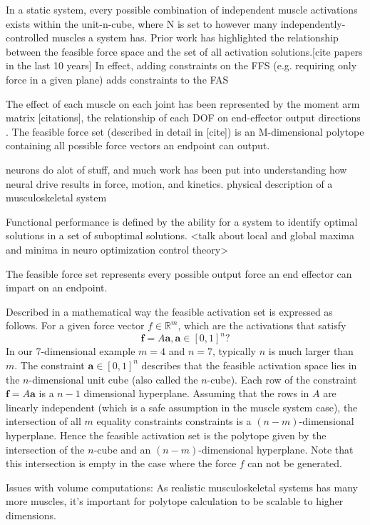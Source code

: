 In a static system, every possible combination of independent muscle activations exists within the unit-n-cube, where N is set to however many independently-controlled muscles a system has.
Prior work has highlighted the relationship between the feasible force space and the set of all activation solutions.[cite papers in the last 10 years]
In effect, adding constraints on the FFS (e.g. requiring only force in a given plane) adds constraints to the FAS

The effect of each muscle on each joint has been represented by the moment arm matrix [citations], the relationship of each DOF on end-effector output directions .
The feasible force set (described in detail in [cite]) is an M-dimensional polytope containing all possible force vectors an endpoint can output.

neurons do alot of stuff, and much work has been put into understanding how neural drive results in force, motion, and kinetics. 
physical description of a musculoskeletal system


Functional performance is defined by the ability for a system to identify optimal solutions in a set of suboptimal solutions. 
<talk about local and global maxima and minima in neuro optimization control theory>

The feasible force set represents every possible output force an end effector can impart on an endpoint.


Described in a mathematical way the feasible activation set is expressed as follows. For a given force vector $f \in \mathbb{R}^m$, which are the activations that satisfy
\[\textbf{f} = A\textbf{a}, \textbf{a} \in [0,1]^n?\]
In our 7-dimensional example $m =4$ and $n =7$, typically $n$ is much larger than $m$.
The constraint $\textbf{a} \in [0,1]^n$ describes that the feasible activation space lies in the $n$-dimensional unit cube (also called the $n$-cube). Each row of the constraint $\textbf{f} = A\textbf{a}$ is a $n-1$ dimensional hyperplane. Assuming that the rows in $A$ are linearly independent (which is a safe assumption in the muscle system case), the intersection of all $m$ equality constraints constraints is a $(n-m)$-dimensional hyperplane. Hence the feasible activation set is the polytope given by the intersection of the $n$-cube and an $(n-m)$-dimensional hyperplane. Note that this intersection is empty in the case where the force $f$ can not be generated.


Issues with volume computations:
As realistic musculoskeletal systems has many more muscles, it's important for polytope calculation to be scalable to higher dimensions.


